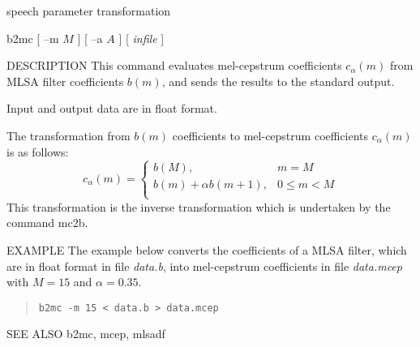 %
{speech parameter transformation}

\begin{synopsis}
\item [b2mc] [ --m $M$ ] [ --a $A$ ] [ {\em infile} ]
\end{synopsis}

\begin{qsection}{DESCRIPTION}
This command evaluates mel-cepstrum coefficients $c_\alpha(m)$ from
MLSA filter coefficients $b(m)$, and sends the results to the standard
output.
\par
Input and output data are in float format.
\par
The transformation from $b(m)$ coefficients to mel-cepstrum coefficients
$c_\alpha(m)$ is as follows:
\begin{displaymath}
c_\alpha(m) = \left\{
	\begin{array}{ll}
	  b(M), & m=M \\
	  b(m) + \alpha b(m+1), & 0 \leq m < M \\
	\end{array} \right.
\end{displaymath}
This transformation is the inverse transformation which is undertaken
by the command mc2b.

\end{qsection}

\begin{options}
\end{options}

\begin{qsection}{EXAMPLE}
The example below converts the coefficients of a MLSA filter,
which are in float format in file {\em data.b},
into mel-cepstrum coefficients
in file {\em data.mcep} with $M=15$ and $\alpha=0.35$.
\begin{quote}
 \verb!b2mc -m 15 < data.b > data.mcep!
\end{quote} 
\end{qsection}

\begin{qsection}{SEE ALSO}
b2mc, mcep, mlsadf
\end{qsection}
